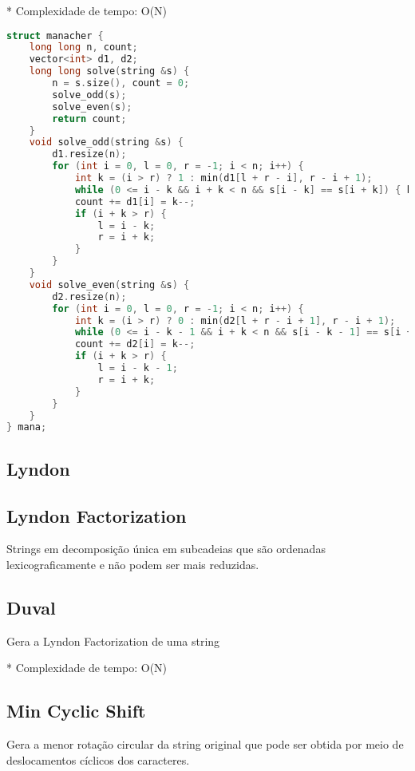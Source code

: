 \documentclass[11pt, a4paper, twoside]{article}
\begin{document}
* Complexidade de tempo: O(N)

\begin{lstlisting}[language=C++]
struct manacher {
    long long n, count;
    vector<int> d1, d2;
    long long solve(string &s) {
        n = s.size(), count = 0;
        solve_odd(s);
        solve_even(s);
        return count;
    }
    void solve_odd(string &s) {
        d1.resize(n);
        for (int i = 0, l = 0, r = -1; i < n; i++) {
            int k = (i > r) ? 1 : min(d1[l + r - i], r - i + 1);
            while (0 <= i - k && i + k < n && s[i - k] == s[i + k]) { k++; }
            count += d1[i] = k--;
            if (i + k > r) {
                l = i - k;
                r = i + k;
            }
        }
    }
    void solve_even(string &s) {
        d2.resize(n);
        for (int i = 0, l = 0, r = -1; i < n; i++) {
            int k = (i > r) ? 0 : min(d2[l + r - i + 1], r - i + 1);
            while (0 <= i - k - 1 && i + k < n && s[i - k - 1] == s[i + k]) { k++; }
            count += d2[i] = k--;
            if (i + k > r) {
                l = i - k - 1;
                r = i + k;
            }
        }
    }
} mana;
\end{lstlisting}

\subsection{Lyndon}

\subsection{Lyndon Factorization}


Strings em decomposição única em subcadeias que são ordenadas lexicograficamente e não podem ser mais reduzidas.

\subsection{Duval}


Gera a Lyndon Factorization de uma string

* Complexidade de tempo: O(N)

\subsection{Min Cyclic Shift}


Gera a menor rotação circular da string original que pode ser obtida por meio de deslocamentos cíclicos dos caracteres.
\end{document}
